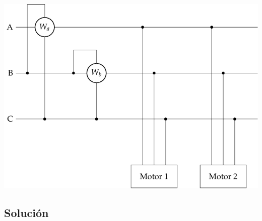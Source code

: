 \begin{center}
  \includegraphics[width=.65\linewidth]{figuras/BT3_13}
\end{center}

\subsection*{Solución}

